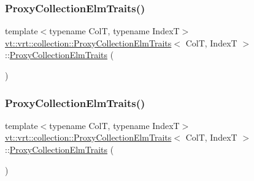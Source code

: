 \subsubsection{\texorpdfstring{Proxy\+Collection\+Elm\+Traits()}{ProxyCollectionElmTraits()}\hspace{0.1cm}{\footnotesize\ttfamily [1/4]}}
{\footnotesize\ttfamily template$<$typename ColT, typename IndexT$>$ \\
\hyperlink{structvt_1_1vrt_1_1collection_1_1_proxy_collection_elm_traits}{vt\+::vrt\+::collection\+::\+Proxy\+Collection\+Elm\+Traits}$<$ ColT, IndexT $>$\+::\hyperlink{structvt_1_1vrt_1_1collection_1_1_proxy_collection_elm_traits}{Proxy\+Collection\+Elm\+Traits} (\begin{DoxyParamCaption}{ }\end{DoxyParamCaption})\hspace{0.3cm}{\ttfamily [default]}}

\mbox{\label{structvt_1_1vrt_1_1collection_1_1_proxy_collection_elm_traits_af40e58d7124ed1c6291e971fb7bf7526}} 
\subsubsection{\texorpdfstring{Proxy\+Collection\+Elm\+Traits()}{ProxyCollectionElmTraits()}\hspace{0.1cm}{\footnotesize\ttfamily [2/4]}}
{\footnotesize\ttfamily template$<$typename ColT, typename IndexT$>$ \\
\hyperlink{structvt_1_1vrt_1_1collection_1_1_proxy_collection_elm_traits}{vt\+::vrt\+::collection\+::\+Proxy\+Collection\+Elm\+Traits}$<$ ColT, IndexT $>$\+::\hyperlink{structvt_1_1vrt_1_1collection_1_1_proxy_collection_elm_traits}{Proxy\+Collection\+Elm\+Traits} (\begin{DoxyParamCaption}\item[{\hyperlink{structvt_1_1vrt_1_1collection_1_1_proxy_collection_elm_traits}{Proxy\+Collection\+Elm\+Traits}$<$ ColT, IndexT $>$ const \&}]{ }\end{DoxyParamCaption})\hspace{0.3cm}{\ttfamily [default]}}

